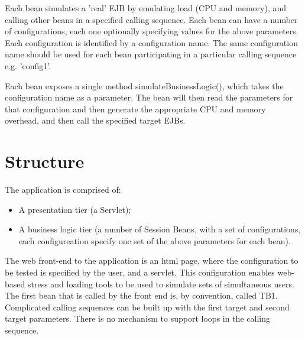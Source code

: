 Each bean simulates a 'real' EJB by emulating load (CPU and memory), and calling other beans in a specified calling sequence. Each bean can have a number of configurations, each one optionally specifying values for the above parameters. Each configuration is identified by a configuration name. The same configuration name should be used for each bean participating in a particular calling sequence e.g. 'config1'. 

Each bean exposes a single method simulateBusinessLogic(), which takes the configuration name as a parameter. The bean will then read the parameters for that configuration and then generate the appropriate CPU and memory overhead, and then call the specified target EJBs.

\section*{Structure}
The application is comprised of: 
\begin{itemize}
 \item A presentation tier (a Servlet);
 \item A business logic tier (a number of Session Beans, with a set of configurations, each configureation specify one set of the above parameters for each bean).
\end{itemize}

The web front-end to the application is an html page, where the configuration to be tested is specified by the user, and a servlet. This configuration enables web-based stress and loading tools to be used to simulate sets of simultaneous users. The first bean that is called by the front end is, by convention, called TB1. Complicated calling sequences can be built up with the first target and second target parameters. There is no mechanism to support loops in the calling sequence.
